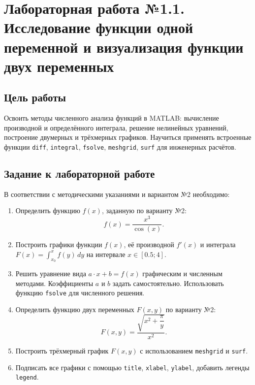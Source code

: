 \chapter{Лабораторная работа №1.1. Исследование функции одной переменной и визуализация функции двух переменных}
\label{ch:chap1}

\section{Цель работы}
\label{sec:goal1}

    Освоить методы численного анализа функций в MATLAB: вычисление производной и определённого интеграла, решение нелинейных уравнений, построение двумерных и трёхмерных графиков. Научиться применять встроенные функции \verb|diff|, \verb|integral|, \verb|fsolve|, \verb|meshgrid|, \verb|surf| для инженерных расчётов.

\section{Задание к лабораторной работе}
\label{sec:task1}

    В соответствии с методическими указаниями \cite{andreev2024tmo} и вариантом №2 необходимо:

    \begin{enumerate}
        \item Определить функцию $f(x)$, заданную по варианту №2:
        \begin{equation}
        \label{eq:f}
            f(x) = \frac{x^3}{\cos(x)}.
        \end{equation}
        \item Построить графики функции $f(x)$, её производной $f'(x)$ и интеграла $F(x) = \int_{x_0}^{x} f(y) \, dy$ на интервале $x \in [0.5; 4]$.
        \item Решить уравнение вида $a \cdot x + b = f(x)$ графическим и численным методами. Коэффициенты $a$ и $b$ задать самостоятельно. Использовать функцию \verb|fsolve| для численного решения.
        \item Определить функцию двух переменных $F(x,y)$ по варианту №2:
        \begin{equation}
        \label{eq:F}
            F(x,y) = \frac{\sqrt{x^2 + \dfrac{\pi}{y}}}{x^2}.
        \end{equation}
        \item Построить трёхмерный график $F(x,y)$ с использованием \verb|meshgrid| и \verb|surf|.
        \item Подписать все графики с помощью \verb|title|, \verb|xlabel|, \verb|ylabel|, добавить легенды \verb|legend|.
    \end{enumerate}

